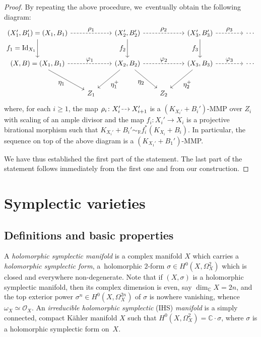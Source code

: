 \documentclass[JEP,XML,SOM,Unicode,published]{cedram}
\let\ts\textstyle
\newcommand{\dradpl}{{\hspace*{-2.5mm}\begin{tikzcd}[ampersand replacement=\&,column sep = scriptsize]\mbox{}\ar[r,dashed]\&\mbox{}\end{tikzcd}\hspace*{-2.5mm}}}
\newcommand{\dratst}{{\hspace*{-2.5mm}\begin{tikzcd}[ampersand replacement=\&,column sep = small]\mbox{}\ar[r,dashed]\&\mbox{}\end{tikzcd}\hspace*{-2mm}}}
\let\drascst\dratst
\newcommand{\dra}{\mathchoice{\dradpl}{\dratst}{\drascst}{\drascst}}
\theoremstyle{plain}
\theoremstyle{definition}
\newcommand{\R}{\mathbb{R}}
\newcommand{\C}{\mathbb{C}}
\newcommand{\OO}{\mathcal{O}}
\DeclareMathOperator{\Id}{Id}
\begin{document}
\begin{proof}
By repeating the above procedure, we~eventually obtain the following diagram:
\[
\begin{tikzcd}[column sep = 2em, row sep = large]
(X_1',B_1') = (X_1,B_1) \arrow[d, "\ts f_1 = \Id_{X_1}" swap] \arrow[rr, dashed, "\ts \rho_1"] && (X_2',B_2') \arrow[d, "\ts f_2" swap] \arrow[rr, dashed, "\ts \rho_2"] && (X_3',B_3') \arrow[d, "\ts f_3" swap] \arrow[rr, dashed, "\ts \rho_3"] && \cdots
\\
(X,B) = (X_1,B_1) \arrow[dr, "\ts \eta_1" swap] \arrow[rr, dashed, "\ts \varphi_1"] && (X_2,B_2) \arrow[dl, "\ts \eta_1^+"] \arrow[dr, "\ts \eta_2" swap] \arrow[rr, dashed, "\ts \varphi_2"] && (X_3,B_3) \arrow[dl, "\ts \eta_2^+"] \arrow[rr, dashed, "\ts \varphi_3"] && \cdots
\\
& Z_1 && Z_2
\end{tikzcd}
\]
where, for each $i \geq 1$, the map $ \rho_i \colon X_i' \dra X_{i+1}' $ is a $(K_{X_i'}+B_i')$-MMP over $ Z_i $ with scaling of an ample divisor and the map $f_i \colon X_i' \to X_i$ is a projective birational morphism such that
$ K_{X_i'} + B_i' \sim_\R f_i^* (K_{X_i} + B_i) $.
In particular, the sequence on top of the above diagram is a $(K_{X_1'} + B_1')$-MMP.

We have thus established the first part of the statement. The last part of the statement follows immediately from the first one and from our construction.
\end{proof}

\section{Symplectic varieties}
\label{section:symplectic_varieties}

\subsection{Definitions and basic properties}
\label{subsection:def_symplectic}

A \emph{holomorphic symplectic manifold} is a complex manifold $X$ which carries a \emph{holomorphic symplectic form}, \ie a~holomorphic $2$-form $\sigma \in H^0 (X, \Omega^2_X)$ which is closed and everywhere non-degenerate. Note that if $(X,\sigma)$ is a holomorphic symplectic manifold, then its complex dimension is even, say $\dim_\C X = 2n$, and the top exterior power $\sigma^n \in H^0 (X, \Omega^{2n}_X)$ of $\sigma$ is nowhere vanishing, whence $\omega_X \simeq \OO_X$.
An \emph{irreducible holomorphic symplectic} (IHS) \emph{manifold} is a simply connected, compact Kähler manifold $X$ such that $H^0 (X, \Omega^2_X) = \C \cdot \sigma$, where $\sigma$ is a holomorphic symplectic form on~$X$.
\end{document}
